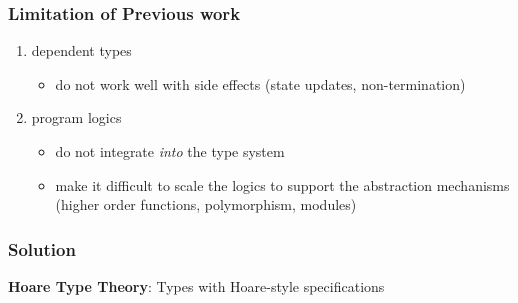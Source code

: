 \documentclass[xcolor=dvipsnames,9pt,hide notes,mathserif]{beamer}
\begin{document}





\begin{frame}
  \frametitle{Limitation of Previous work}
  \begin{enumerate}
  \item dependent types
    \begin{itemize}
    \item do not work well with side effects (state updates, non-termination)
    \end{itemize}
  \item program logics
    \begin{itemize}
    \item do not integrate \textit{into} the type system
    \item make it difficult to scale the logics to support the
      abstraction mechanisms (higher order functions, polymorphism,
      modules)
    \end{itemize}
  \end{enumerate}
\end{frame}











\begin{frame}
  \frametitle{Solution}
  \textbf{Hoare Type Theory}: Types with Hoare-style specifications
\end{frame}
\end{document}
